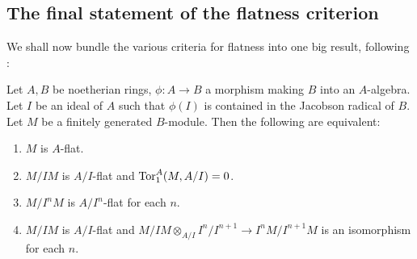 \subsection{The final statement of the flatness criterion}

We shall now bundle the various criteria for flatness into one big result,
following \cite{SGA1}:

\begin{theorem} \label{bigflatcriterion}
Let $A, B$ be noetherian rings, $\phi: A \to B$ a morphism making $B$ into an
$A$-algebra. Let $I$ be an ideal of $A$ such that $\phi(I)$ is contained in the
Jacobson radical of $B$.
Let $M$ be a finitely generated $B$-module.
Then the following are equivalent:
\begin{enumerate}
\item $M$ is $A$-flat. 
\item $M/IM$ is $A/I$-flat and $\operatorname{Tor}_1^A(M, A/I) = 0$.
\item  $M/I^n M$ is $A/I^n$-flat for each $n$.
\item  $M/IM$ is $A/I$-flat and $M/IM \otimes_{A/I} I^n/I^{n+1} \to I^n
M/I^{n+1}M$ is an isomorphism for each $n$.
\end{enumerate}
\end{theorem} 

